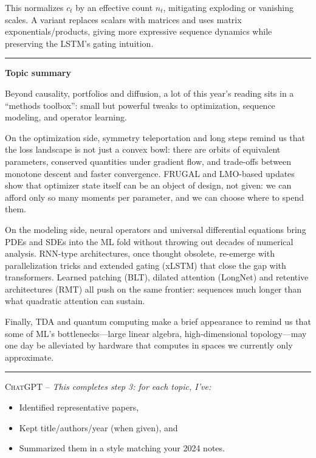 \documentclass[a5paper]{article}
\providecommand{\tightlist}{%
  \setlength{\itemsep}{0pt}\setlength{\parskip}{0pt}}
\def\subsection#1{{\par\bigskip\goodbreak\large\bfseries #1\par}}
\begin{document}
This normalizes $c_t$ by an effective count $n_t$, mitigating exploding or
vanishing scales. A variant replaces scalars with matrices and uses
matrix exponentials/products, giving more expressive sequence dynamics
while preserving the LSTM's gating intuition.

\begin{center}\rule{0.5\linewidth}{0.5pt}\end{center}

\subsection{Topic summary}\label{topic-summary-14}

Beyond causality, portfolios and diffusion, a lot of this year's reading
sits in a ``methods toolbox'': small but powerful tweaks to
optimization, sequence modeling, and operator learning.

On the optimization side, symmetry teleportation and long steps remind
us that the loss landscape is not just a convex bowl: there are orbits
of equivalent parameters, conserved quantities under gradient flow, and
trade-offs between monotone descent and faster convergence. FRUGAL and
LMO-based updates show that optimizer state itself can be an object of
design, not given: we can afford only so many moments per parameter, and
we can choose where to spend them.

On the modeling side, neural operators and universal differential
equations bring PDEs and SDEs into the ML fold without throwing out
decades of numerical analysis. RNN-type architectures, once thought
obsolete, re-emerge with parallelization tricks and extended gating
(xLSTM) that close the gap with transformers. Learned patching (BLT),
dilated attention (LongNet) and retentive architectures (RMT) all push
on the same frontier: sequences much longer than what quadratic
attention can sustain.

Finally, TDA and quantum computing make a brief appearance to remind us
that some of ML's bottlenecks---large linear algebra, high-dimensional
topology---may one day be alleviated by hardware that computes in spaces
we currently only approximate.

\begin{center}\rule{0.5\linewidth}{0.5pt}\end{center}

\textsc{ChatGPT --}
\itshape
This completes step 3: for each topic, I've:
\begin{itemize}
\tightlist
\item
  Identified representative papers,
\item
  Kept title/authors/year (when given), and
\item
  Summarized them in a style matching your 2024 notes.
\end{itemize}
\end{document}
